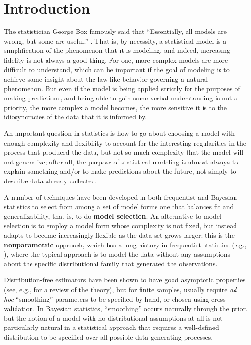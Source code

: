 \section{Introduction}

The statistician George Box famously said that 
``Essentially, all models are wrong, but some are useful.''
\citep{box1987empirical}.  
That is, by necessity, a statistical model is a simplification of the phenomenon
that it is modeling, and indeed, increasing fidelity is not always a
good thing.  For one, more complex models are more difficult to
understand, which can be important if the goal of modeling is to
achieve some insight about the law-like behavior governing a natural
phenomenon.  But even if the model is being applied strictly for the
purposes of making predictions, and being able to gain some verbal
understanding is not a priority, the more complex a model becomes, the
more sensitive it is to the idiosyncracies of the data that it is
informed by.

An important question in statistics is how to go about choosing a
model with enough complexity and flexibility to account for 
the interesting regularities in the process that produced the data, 
but not so much complexity that the model will not generalize; 
after all, the purpose of statistical
modeling is almost always to explain something and/or to make
predictions about the future, not simply to describe data already
collected.

A number of techniques have been developed in both frequentist and
Bayesian statistics to select from among a set
of model forms one that balances fit and generalizability, that is, to
do {\bf model selection}.  An alternative to model selection is to
employ a model form whose complexity is not fixed, but instead adapts
to become increasingly flexible as the data set grows larger: this is
the {\bf nonparametric} approach, which has a long history in
frequentist statistics (e.g., \cite{rosenblatt1956remarks,
  parzen1962estimation}), where the typical approach is to model the
data without any assumptions about the specific distributional family
that generated the observations.  

Distribution-free estimators have
been shown to have good asymptotic properties (see, e.g.,
\cite{wasserman2007nonparametric} for a review of the theory), but for finite
samples, usually require {\em ad hoc} ``smoothing'' parameters to be
specified by hand, or chosen using cross-validation.  In Bayesian
statistics, ``smoothing'' occurs naturally through the prior, but the
notion of a model with no distributional assumptions at all is not
particularly natural in a statistical approach that requires a well-defined
distribution to be specified over all possible data generating
processes.

